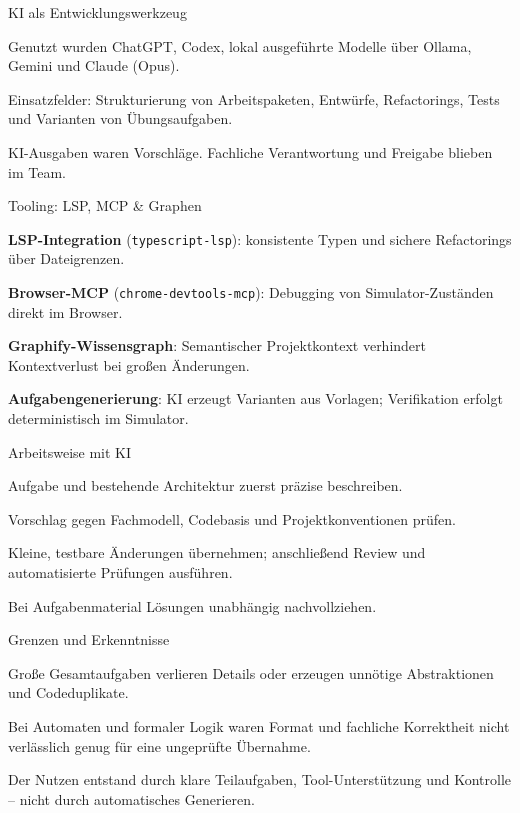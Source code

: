 
\begin{itemframe}{KI als Entwicklungswerkzeug}
  \item Genutzt wurden ChatGPT, Codex, lokal ausgeführte Modelle über Ollama, Gemini und Claude (Opus).
  \item Einsatzfelder: Strukturierung von Arbeitspaketen, Entwürfe, Refactorings, Tests und Varianten von Übungsaufgaben.
  \item KI-Ausgaben waren Vorschläge. Fachliche Verantwortung und Freigabe blieben im Team.
\end{itemframe}

\begin{itemframe}{Tooling: LSP, MCP \& Graphen}
  \item \textbf{LSP-Integration} (\texttt{typescript-lsp}): konsistente Typen und sichere Refactorings über Dateigrenzen.
  \item \textbf{Browser-MCP} (\texttt{chrome-\allowbreak devtools-\allowbreak mcp}): Debugging von Simulator-Zuständen direkt im Browser.
  \item \textbf{Graphify-Wissensgraph}: Semantischer Projektkontext verhindert Kontextverlust bei großen Änderungen.
  \item \textbf{Aufgabengenerierung}: KI erzeugt Varianten aus Vorlagen; Verifikation erfolgt deterministisch im Simulator.
\end{itemframe}

\begin{itemframe}{Arbeitsweise mit KI}
  \item Aufgabe und bestehende Architektur zuerst präzise beschreiben.
  \item Vorschlag gegen Fachmodell, Codebasis und Projektkonventionen prüfen.
  \item Kleine, testbare Änderungen übernehmen; anschließend Review und automatisierte Prüfungen ausführen.
  \item Bei Aufgabenmaterial Lösungen unabhängig nachvollziehen.
\end{itemframe}

\begin{itemframe}{Grenzen und Erkenntnisse}
  \item Große Gesamtaufgaben verlieren Details oder erzeugen unnötige Abstraktionen und Codeduplikate.
  \item Bei Automaten und formaler Logik waren Format und fachliche Korrektheit nicht verlässlich genug für eine ungeprüfte Übernahme.
  \item Der Nutzen entstand durch klare Teilaufgaben, Tool-Unterstützung und Kontrolle -- nicht durch automatisches Generieren.
\end{itemframe}
